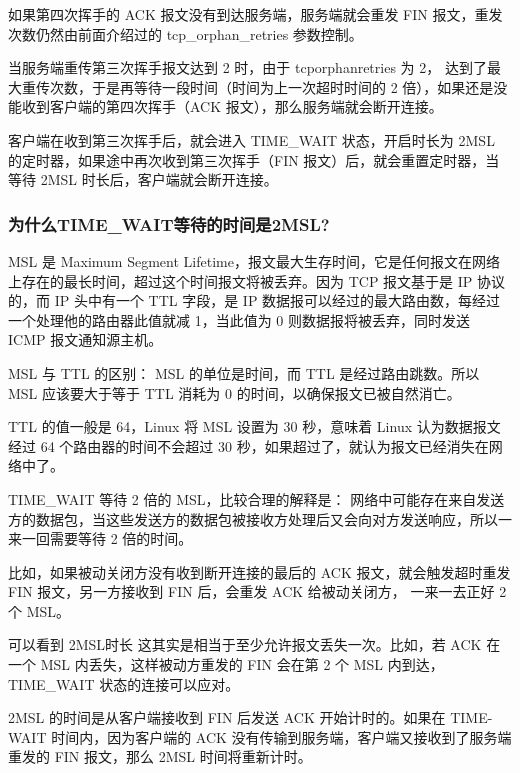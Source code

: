 \documentclass[11pt]{article}
\begin{document}
如果第四次挥手的 ACK 报文没有到达服务端，服务端就会重发 FIN 报文，重发次数仍然由前面介绍过的 tcp\_orphan\_retries 参数控制。

当服务端重传第三次挥手报文达到 2 时，由于 tcporphanretries 为 2， 达到了最大重传次数，于是再等待一段时间（时间为上一次超时时间的 2 倍），如果还是没能收到客户端的第四次挥手（ACK 报文），那么服务端就会断开连接。

客户端在收到第三次挥手后，就会进入 TIME\_WAIT 状态，开启时长为 2MSL 的定时器，如果途中再次收到第三次挥手（FIN 报文）后，就会重置定时器，当等待 2MSL 时长后，客户端就会断开连接。
\subsubsection{为什么TIME\_WAIT等待的时间是2MSL?}
\label{sec:org35043b4}
MSL 是 Maximum Segment Lifetime，报文最大生存时间，它是任何报文在网络上存在的最长时间，超过这个时间报文将被丢弃。因为 TCP 报文基于是 IP 协议的，而 IP 头中有一个 TTL 字段，是 IP 数据报可以经过的最大路由数，每经过一个处理他的路由器此值就减 1，当此值为 0 则数据报将被丢弃，同时发送 ICMP 报文通知源主机。

MSL 与 TTL 的区别： MSL 的单位是时间，而 TTL 是经过路由跳数。所以 MSL 应该要大于等于 TTL 消耗为 0 的时间，以确保报文已被自然消亡。

TTL 的值一般是 64，Linux 将 MSL 设置为 30 秒，意味着 Linux 认为数据报文经过 64 个路由器的时间不会超过 30 秒，如果超过了，就认为报文已经消失在网络中了。

TIME\_WAIT 等待 2 倍的 MSL，比较合理的解释是： 网络中可能存在来自发送方的数据包，当这些发送方的数据包被接收方处理后又会向对方发送响应，所以一来一回需要等待 2 倍的时间。

比如，如果被动关闭方没有收到断开连接的最后的 ACK 报文，就会触发超时重发 FIN 报文，另一方接收到 FIN 后，会重发 ACK 给被动关闭方， 一来一去正好 2 个 MSL。

可以看到 2MSL时长 这其实是相当于至少允许报文丢失一次。比如，若 ACK 在一个 MSL 内丢失，这样被动方重发的 FIN 会在第 2 个 MSL 内到达，TIME\_WAIT 状态的连接可以应对。

2MSL 的时间是从客户端接收到 FIN 后发送 ACK 开始计时的。如果在 TIME-WAIT 时间内，因为客户端的 ACK 没有传输到服务端，客户端又接收到了服务端重发的 FIN 报文，那么 2MSL 时间将重新计时。
\end{document}
